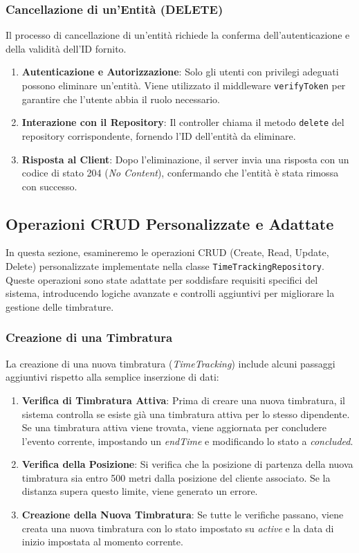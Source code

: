 \documentclass[twoside]{supsistudent}
\begin{document}
\subsubsection{Cancellazione di un'Entità (DELETE)}

Il processo di cancellazione di un'entità richiede la conferma dell'autenticazione e della validità dell'ID fornito.

\begin{enumerate}
  \item \textbf{Autenticazione e Autorizzazione}: Solo gli utenti con privilegi adeguati possono eliminare un'entità. Viene utilizzato il middleware \texttt{verifyToken} per garantire che l'utente abbia il ruolo necessario.
  \item \textbf{Interazione con il Repository}: Il controller chiama il metodo \texttt{delete} del repository corrispondente, fornendo l'ID dell'entità da eliminare.
  \item \textbf{Risposta al Client}: Dopo l'eliminazione, il server invia una risposta con un codice di stato 204 (\textit{No Content}), confermando che l'entità è stata rimossa con successo.
\end{enumerate}

\subsection{Operazioni CRUD Personalizzate e Adattate}

In questa sezione, esamineremo le operazioni CRUD (Create, Read, Update, Delete) personalizzate implementate nella classe \texttt{TimeTrackingRepository}. Queste operazioni sono state adattate per soddisfare requisiti specifici del sistema, introducendo logiche avanzate e controlli aggiuntivi per migliorare la gestione delle timbrature.

\subsubsection{Creazione di una Timbratura}

La creazione di una nuova timbratura (\textit{TimeTracking}) include alcuni passaggi aggiuntivi rispetto alla semplice inserzione di dati:

\begin{enumerate}
  \item \textbf{Verifica di Timbratura Attiva}: Prima di creare una nuova timbratura, il sistema controlla se esiste già una timbratura attiva per lo stesso dipendente. Se una timbratura attiva viene trovata, viene aggiornata per concludere l'evento corrente, impostando un \textit{endTime} e modificando lo stato a \textit{concluded}.
  \item \textbf{Verifica della Posizione}: Si verifica che la posizione di partenza della nuova timbratura sia entro 500 metri dalla posizione del cliente associato. Se la distanza supera questo limite, viene generato un errore.
  \item \textbf{Creazione della Nuova Timbratura}: Se tutte le verifiche passano, viene creata una nuova timbratura con lo stato impostato su \textit{active} e la data di inizio impostata al momento corrente.
\end{enumerate}
\end{document}
